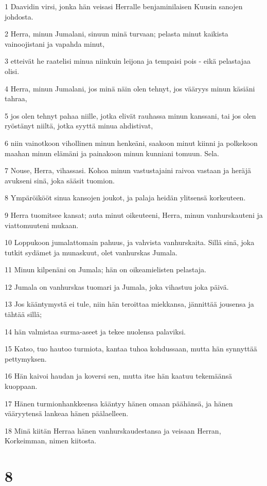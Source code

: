 \par 1 Daavidin virsi, jonka hän veisasi Herralle benjaminilaisen Kuusin sanojen johdosta.
\par 2 Herra, minun Jumalani, sinuun minä turvaan; pelasta minut kaikista vainoojistani ja vapahda minut,
\par 3 etteivät he raatelisi minua niinkuin leijona ja tempaisi pois - eikä pelastajaa olisi.
\par 4 Herra, minun Jumalani, jos minä näin olen tehnyt, jos vääryys minun käsiäni tahraa,
\par 5 jos olen tehnyt pahaa niille, jotka elivät rauhassa minun kanssani, tai jos olen ryöstänyt niiltä, jotka syyttä minua ahdistivat,
\par 6 niin vainotkoon vihollinen minun henkeäni, saakoon minut kiinni ja polkekoon maahan minun elämäni ja painakoon minun kunniani tomuun. Sela.
\par 7 Nouse, Herra, vihassasi. Kohoa minun vastustajaini raivoa vastaan ja heräjä avukseni sinä, joka sääsit tuomion.
\par 8 Ympäröikööt sinua kansojen joukot, ja palaja heidän ylitsensä korkeuteen.
\par 9 Herra tuomitsee kansat; auta minut oikeuteeni, Herra, minun vanhurskauteni ja viattomuuteni mukaan.
\par 10 Loppukoon jumalattomain pahuus, ja vahvista vanhurskaita. Sillä sinä, joka tutkit sydämet ja munaskuut, olet vanhurskas Jumala.
\par 11 Minun kilpenäni on Jumala; hän on oikeamielisten pelastaja.
\par 12 Jumala on vanhurskas tuomari ja Jumala, joka vihastuu joka päivä.
\par 13 Jos kääntymystä ei tule, niin hän teroittaa miekkansa, jännittää jousensa ja tähtää sillä;
\par 14 hän valmistaa surma-aseet ja tekee nuolensa palaviksi.
\par 15 Katso, tuo hautoo turmiota, kantaa tuhoa kohdussaan, mutta hän synnyttää pettymyksen.
\par 16 Hän kaivoi haudan ja koversi sen, mutta itse hän kaatuu tekemäänsä kuoppaan.
\par 17 Hänen turmionhankkeensa kääntyy hänen omaan päähänsä, ja hänen vääryytensä lankeaa hänen päälaelleen.
\par 18 Minä kiitän Herraa hänen vanhurskaudestansa ja veisaan Herran, Korkeimman, nimen kiitosta.

\chapter{8}

